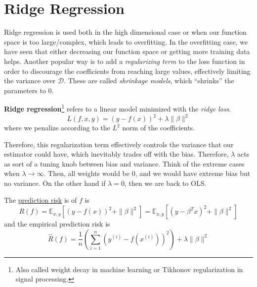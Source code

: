 \section{Ridge Regression} 

  Ridge regression is used both in the high dimensional case or when our function space is too large/complex, which leads to overfitting. In the overfitting case, we have seen that either decreasing our function space or getting more training data helps. Another popular way is to add a \textit{regularizing term} to the loss function in order to discourage the coefficients from reaching large values, effectively limiting the variance over $\mathcal{D}$. These are called \textit{shrinkage models}, which ``shrinks'' the parameters to $0$. 

  \begin{definition}
    \label{def:ridge-regression}
    \textbf{Ridge regression}\footnote{Also called weight decay in machine learning or Tikhonov regularization in signal processing.} refers to a linear model minimized with the \textit{ridge loss}. 
    \begin{equation} 
      L(f, x, y) = (y - f(x))^2 + \lambda \|\beta\|^2
    \end{equation}
    where we penalize according to the $L^2$ norm of the coefficients. 
  \end{definition} 

  Therefore, this regularization term effectively controls the variance that our estimator could have, which inevitably trades off with the bias. Therefore, $\lambda$ acts as sort of a tuning knob between bias and variance. Think of the extreme cases when $\lambda \to \infty$. Then, all weights would be $0$, and we would have extreme bias but no variance. On the other hand if $\lambda = 0$, then we are back to OLS. 

  \begin{lemma}[Risk]
    \label{thm:risk-2}
    The \hyperref[thm:prediction-risk]{prediction risk} is of $f$ is 
    \begin{equation}
      R(f) = \mathbb{E}_{x, y} \left[ (y - f(x))^2 + \|\beta\| ^2 \right] = \mathbb{E}_{x, y} \left[ (y - \beta^T x)^2 + \|\beta\|^2 \right]
    \end{equation}
    and the empirical prediction risk is 
    \begin{equation}
      \hat{R}(f) = \frac{1}{n} \left( \sum_{i=1}^n (y^{(i)} - f(x^{(i)}))^2 \right) + \lambda \|\beta\|^2 
    \end{equation}
  \end{lemma} 

